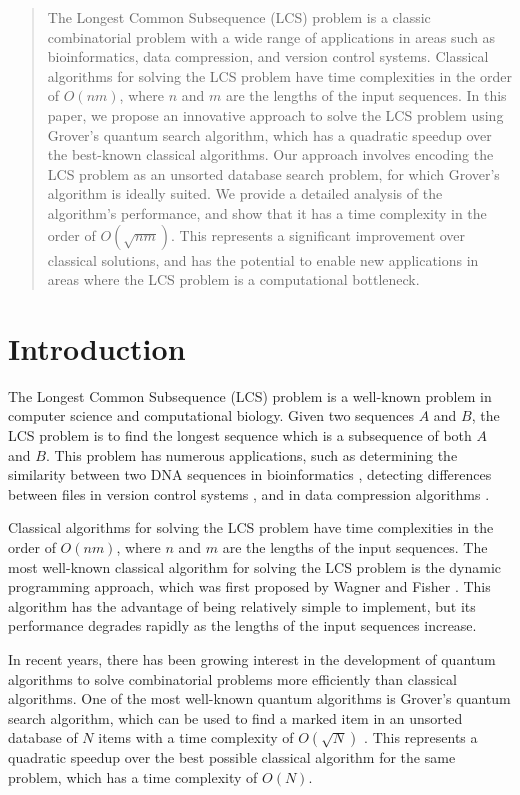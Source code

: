 \begin{abstract}
The Longest Common Subsequence (LCS) problem is a classic combinatorial problem with a wide range of applications in areas such as bioinformatics, data compression, and version control systems. Classical algorithms for solving the LCS problem have time complexities in the order of $O(nm)$, where $n$ and $m$ are the lengths of the input sequences. In this paper, we propose an innovative approach to solve the LCS problem using Grover's quantum search algorithm, which has a quadratic speedup over the best-known classical algorithms. Our approach involves encoding the LCS problem as an unsorted database search problem, for which Grover's algorithm is ideally suited. We provide a detailed analysis of the algorithm's performance, and show that it has a time complexity in the order of $O(\sqrt{nm})$. This represents a significant improvement over classical solutions, and has the potential to enable new applications in areas where the LCS problem is a computational bottleneck.
\end{abstract}

\section{Introduction}

The Longest Common Subsequence (LCS) problem is a well-known problem in computer science and computational biology. Given two sequences $A$ and $B$, the LCS problem is to find the longest sequence which is a subsequence of both $A$ and $B$. This problem has numerous applications, such as determining the similarity between two DNA sequences in bioinformatics \cite{bioinformatics}, detecting differences between files in version control systems \cite{version_control}, and in data compression algorithms \cite{data_compression}.

Classical algorithms for solving the LCS problem have time complexities in the order of $O(nm)$, where $n$ and $m$ are the lengths of the input sequences. The most well-known classical algorithm for solving the LCS problem is the dynamic programming approach, which was first proposed by Wagner and Fisher \cite{wagner_fisher}. This algorithm has the advantage of being relatively simple to implement, but its performance degrades rapidly as the lengths of the input sequences increase.

In recent years, there has been growing interest in the development of quantum algorithms to solve combinatorial problems more efficiently than classical algorithms. One of the most well-known quantum algorithms is Grover's quantum search algorithm, which can be used to find a marked item in an unsorted database of $N$ items with a time complexity of $O(\sqrt{N})$ \cite{grover}. This represents a quadratic speedup over the best possible classical algorithm for the same problem, which has a time complexity of $O(N)$.

